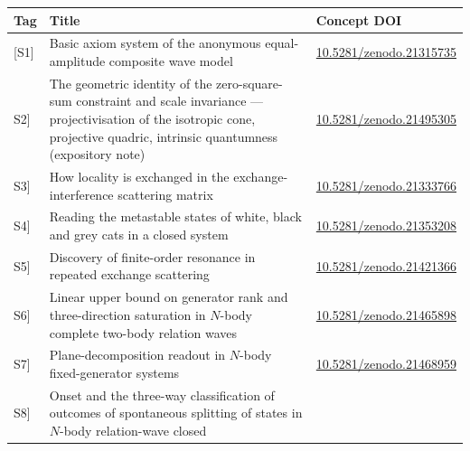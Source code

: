 \documentclass[
  10pt,
]{article}
\newcounter{none} %
\begin{document}
{\def\LTcaptype{none} %
\begin{longtable}[]{@{}
  >{\raggedright\arraybackslash}p{}
  >{\raggedright\arraybackslash}p{}
  >{\raggedright\arraybackslash}p{}@{}}
\toprule\noalign{}
\begin{minipage}[b]{\linewidth}\raggedright
Tag
\end{minipage} & \begin{minipage}[b]{\linewidth}\raggedright
Title
\end{minipage} & \begin{minipage}[b]{\linewidth}\raggedright
Concept DOI
\end{minipage} \\
\midrule\noalign{}
\endhead
\bottomrule\noalign{}
\endlastfoot
{[}S1{]} & Basic axiom system of the anonymous equal-amplitude composite
wave model &
\href{https://doi.org/10.5281/zenodo.21315735}{10.5281/zenodo.21315735} \\
{[}S2{]} & The geometric identity of the zero-square-sum constraint and
scale invariance --- projectivisation of the isotropic cone, projective
quadric, intrinsic quantumness (expository note) &
\href{https://doi.org/10.5281/zenodo.21495305}{10.5281/zenodo.21495305} \\
{[}S3{]} & How locality is exchanged in the exchange-interference
scattering matrix &
\href{https://doi.org/10.5281/zenodo.21333766}{10.5281/zenodo.21333766} \\
{[}S4{]} & Reading the metastable states of white, black and grey cats
in a closed system &
\href{https://doi.org/10.5281/zenodo.21353208}{10.5281/zenodo.21353208} \\
{[}S5{]} & Discovery of finite-order resonance in repeated exchange
scattering &
\href{https://doi.org/10.5281/zenodo.21421366}{10.5281/zenodo.21421366} \\
{[}S6{]} & Linear upper bound on generator rank and three-direction
saturation in \(N\)-body complete two-body relation waves &
\href{https://doi.org/10.5281/zenodo.21465898}{10.5281/zenodo.21465898} \\
{[}S7{]} & Plane-decomposition readout in \(N\)-body fixed-generator
systems &
\href{https://doi.org/10.5281/zenodo.21468959}{10.5281/zenodo.21468959} \\
{[}S8{]} & Onset and the three-way classification of outcomes of
spontaneous splitting of states in \(N\)-body relation-wave closed

\end{longtable}}
\end{document}

